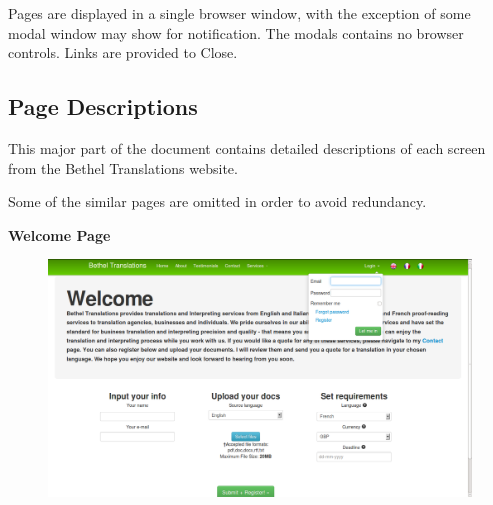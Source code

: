 \documentclass{l3proj}
\begin{document}
Pages are displayed in a single browser window, with the exception
of some modal window may show for notification. The modals
contains no browser controls. Links are provided to Close.

\subsection{Page Descriptions}

This major part of the document contains detailed descriptions of
each screen from the Bethel Translations website.

Some of the similar pages are omitted in order to avoid redundancy.

\textbf{Welcome Page}
\begin{figure}[H]
\centering
\includegraphics[width=0.8\linewidth]{images/welcomePage}
\vspace{-30pt}
\end{figure}
\end{document}
